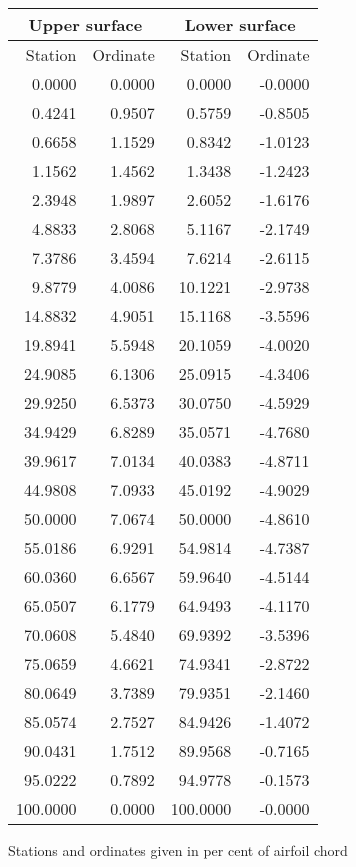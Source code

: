 \documentclass[11pt]{book}
\begin{document}
 \hspace{4mm}
 \begin{tabular}{|r|r|r|r|} \hline 
 \multicolumn{2}{|c|}{Upper surface} & \multicolumn{2}{|c|}{Lower surface} \\
 \hline
 Station & Ordinate & Station & Ordinate \\
 \hline
0.0000 & 0.0000 & 0.0000 & -0.0000 \\
0.4241 & 0.9507 & 0.5759 & -0.8505 \\
0.6658 & 1.1529 & 0.8342 & -1.0123 \\
1.1562 & 1.4562 & 1.3438 & -1.2423 \\
2.3948 & 1.9897 & 2.6052 & -1.6176 \\
4.8833 & 2.8068 & 5.1167 & -2.1749 \\
7.3786 & 3.4594 & 7.6214 & -2.6115 \\
9.8779 & 4.0086 & 10.1221 & -2.9738 \\
14.8832 & 4.9051 & 15.1168 & -3.5596 \\
19.8941 & 5.5948 & 20.1059 & -4.0020 \\
24.9085 & 6.1306 & 25.0915 & -4.3406 \\
29.9250 & 6.5373 & 30.0750 & -4.5929 \\
34.9429 & 6.8289 & 35.0571 & -4.7680 \\
39.9617 & 7.0134 & 40.0383 & -4.8711 \\
44.9808 & 7.0933 & 45.0192 & -4.9029 \\
50.0000 & 7.0674 & 50.0000 & -4.8610 \\
55.0186 & 6.9291 & 54.9814 & -4.7387 \\
60.0360 & 6.6567 & 59.9640 & -4.5144 \\
65.0507 & 6.1779 & 64.9493 & -4.1170 \\
70.0608 & 5.4840 & 69.9392 & -3.5396 \\
75.0659 & 4.6621 & 74.9341 & -2.8722 \\
80.0649 & 3.7389 & 79.9351 & -2.1460 \\
85.0574 & 2.7527 & 84.9426 & -1.4072 \\
90.0431 & 1.7512 & 89.9568 & -0.7165 \\
95.0222 & 0.7892 & 94.9778 & -0.1573 \\
100.0000 & 0.0000 & 100.0000 & -0.0000 \\
 \hline 
 \end{tabular}
 \vspace{8mm}

Stations and ordinates given in per cent of airfoil chord
\end{document}
